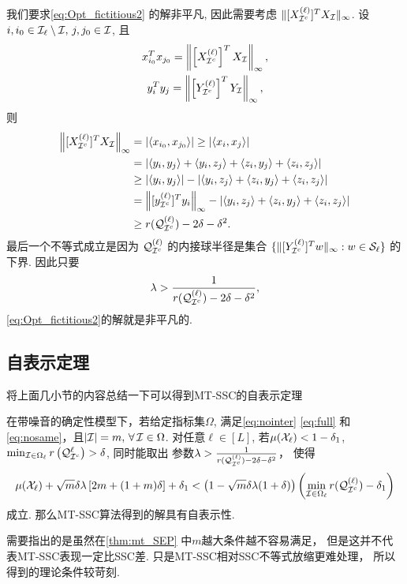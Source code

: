 我们要求\eqref{eq:Opt_fictitious2} 的解非平凡, 因此需要考虑
\(\|[X_{\mathcal{I}^c}^{(\ell)}]^T X_{\mathcal{I}} \|_{\infty} \).
设\(i, i_0\in \mathcal{I}_\ell \setminus \mathcal{I}, \, j, j_0\in
\mathcal{I}\), 且
\begin{gather*}
x_{i_0}^T x_{j_0}=\left\|\left[X_{\mathcal{I}^c}^{(\ell)}\right]^T X_{\mathcal{I}}\right\|_\infty, \\
y_i^T y_j=\left\|\left[ Y_{\mathcal{I}^c}^{(\ell)}\right]^T Y_{\mathcal{I}}\right\|_\infty ,
\end{gather*}
则
\begin{align}
  \left\|[X_{\mathcal{I}^c}^{(\ell)}]^TX_{\mathcal{I}}\right\|_{\infty}&=\left|\langle x_{i_0},
  x_{j_0}\rangle\right|  \geq \left|\langle x_i, x_j\rangle\right|\nonumber\\
  &= \left|\langle y_i, y_j\rangle  + \langle y_i, z_j\rangle + \langle z_i, y_j\rangle + \langle z_i, z_j\rangle\right|\nonumber\\
  &\geq \left|\langle y_i, y_j\rangle\right| - \left|\langle y_i, z_j\rangle + \langle z_i, y_j\rangle + \langle z_i, z_j\rangle\right|\nonumber\\
  & = \left\|[y_{\mathcal{I}^c}^{(\ell)}]^Ty_i\right\|_{\infty} - \left|\langle y_i, z_j\rangle + \langle z_i, y_j\rangle + \langle z_i, z_j\rangle\right|\nonumber\\
  &\geq r(\mathcal{Q}^{(\ell)}_{\mathcal{I}^c}) - 2\delta - \delta^2. \label{eq:lowerbounding_maX_affinity}
\end{align}
最后一个不等式成立是因为 \(\mathcal{Q}^{(\ell)}_{\mathcal{I}^c}\) 
的内接球半径是集合 \(\{\| [ Y_{\mathcal{I}^c}^{(\ell)}]^T w\|_\infty: w
\in  \mathcal{S}_{\ell}\} \) 的下界. 因此只要
\begin{equation}\label{eq:lambda_low}
  \lambda > \frac{1}{ r(\mathcal{Q}^{(\ell)}_{\mathcal{I}^c}) - 2\delta - \delta^2},
\end{equation}
\eqref{eq:Opt_fictitious2}的解就是非平凡的.

\subsection{自表示定理}
将上面几小节的内容总结一下可以得到MT-SSC的自表示定理
\begin{theorem}\label{thm:mt_SEP}
  在带噪音的确定性模型下，若给定指标集\(\Omega\), 满足\eqref{eq:nointer}
  \eqref{eq:full} 和 \eqref{eq:nosame}，且\(|\mathcal{I}|=m, \, \forall\, \mathcal{I} \in \Omega\).
  对任意\(\ell \in [L]\), 若\(\mu(\mathcal{X}_\ell)<1-\delta_1\), \(\min_{\mathcal{I}\in
  \Omega_\ell} r\left(\mathcal{Q}^\ell_{\mathcal{I}^c}\right) > \delta\), 同时能取出
  参数\(\lambda > \frac{1}{ r(\mathcal{Q}^{(\ell)}_{\mathcal{I}^c}) - 2\delta -\delta^2}\)，
  使得
  \[\mu(\mathcal{X}_\ell) +\sqrt{m}\delta\lambda \left[2m+(1+m)\delta \right] +\delta_1
  < \left(1-\sqrt{m}\delta\lambda(1+\delta)\right)\left(\min_{\mathcal{I}\in \Omega_\ell}
  r(\mathcal{Q}^{(\ell)}_{\mathcal{I}^c})-\delta_1\right)\]
  成立. 那么MT-SSC算法得到的解具有自表示性.
\end{theorem}
需要指出的是虽然在\autoref{thm:mt_SEP} 中\(m\)越大条件越不容易满足，
但是这并不代表MT-SSC表现一定比SSC差. 只是MT-SSC相对SSC不等式放缩更难处理，
所以得到的理论条件较苛刻.
